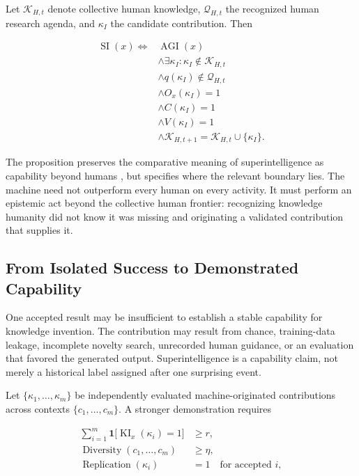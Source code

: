 Let $\mathcal{K}_{H,t}$ denote collective human knowledge,
$\mathcal{Q}_{H,t}$ the recognized human research agenda, and $\kappa_I$ the
candidate contribution. Then

\begin{equation}
\begin{aligned}
\operatorname{SI}(x)
\Longleftrightarrow{}&
\operatorname{AGI}(x)\\
&\land \exists\kappa_I:
\kappa_I\notin\mathcal{K}_{H,t}\\
&\land q(\kappa_I)\notin\mathcal{Q}_{H,t}\\
&\land O_x(\kappa_I)=1\\
&\land C(\kappa_I)=1\\
&\land V(\kappa_I)=1\\
&\land
\mathcal{K}_{H,t+1}
=\mathcal{K}_{H,t}\cup\{\kappa_I\}.
\end{aligned}
\label{eq:knowledge_invention_proposition}
\end{equation}

The proposition preserves the comparative meaning of superintelligence as
capability beyond humans \cite{bostrom2014superintelligence}, but specifies
where the relevant boundary lies. The machine need not outperform every human
on every activity. It must perform an epistemic act beyond the collective human
frontier: recognizing knowledge humanity did not know it was missing and
originating a validated contribution that supplies it.

\subsection{\textbf{From Isolated Success to Demonstrated Capability}}

One accepted result may be insufficient to establish a stable capability for
knowledge invention. The contribution may result from chance, training-data
leakage, incomplete novelty search, unrecorded human guidance, or an evaluation
that favored the generated output. Superintelligence is a capability claim,
not merely a historical label assigned after one surprising event.

Let $\{\kappa_1,\ldots,\kappa_m\}$ be independently evaluated machine-originated
contributions across contexts $\{c_1,\ldots,c_m\}$. A stronger demonstration
requires

\begin{equation}
\begin{aligned}
\sum_{i=1}^{m}
\mathbf{1}
\bigl[\operatorname{KI}_{x}(\kappa_i)=1\bigr]
&\geq r,\\
\operatorname{Diversity}(c_1,\ldots,c_m)
&\geq \eta,\\
\operatorname{Replication}(\kappa_i)
&=1
\quad \text{for accepted } i,
\end{aligned}
\label{eq:repeatable_invention}
\end{equation}

